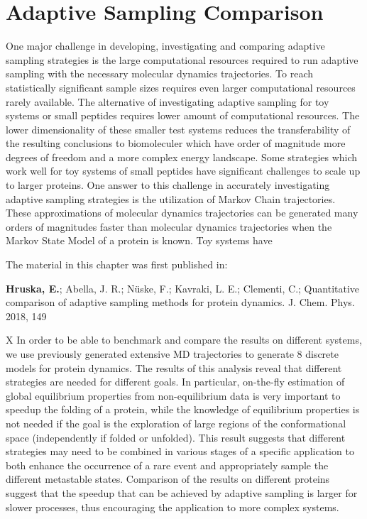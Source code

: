 

\afterpage{\null\newpage}
\chapter{Adaptive Sampling Comparison\label{ch:chapter32}}

One major challenge in developing, investigating and comparing adaptive sampling strategies is the large computational resources required to run adaptive sampling with the necessary molecular dynamics trajectories. To reach statistically significant sample sizes requires even larger computational resources rarely available.
The alternative of investigating adaptive sampling for toy systems or small peptides requires lower amount of computational resources. The lower dimensionality of these smaller test systems reduces the transferability of the resulting conclusions to biomoleculer which have order of magnitude more degrees of freedom and a more complex energy landscape. Some strategies which work well for toy systems of small peptides have significant challenges to scale up to larger proteins. One answer to this challenge in accurately investigating adaptive sampling strategies is the utilization of Markov Chain trajectories. These approximations of molecular dynamics trajectories can be generated many orders of magnitudes faster than molecular dynamics trajectories when the Markov State Model of a protein is known. Toy systems have 

The material in this chapter was first published in: 

\cite{Adstrategies2018} \textbf{Hruska, E.}; Abella, J. R.; N\"uske, F.;
Kavraki, L. E.; Clementi, C.; Quantitative
comparison of adaptive sampling methods
for protein dynamics. J. Chem. Phys.
2018, 149 


X
In order to be able to benchmark and compare the results on different systems, we
use previously generated extensive MD trajectories \cite{lindorff2011} to
generate 8 discrete models for protein dynamics.
The results of this analysis reveal that different strategies are needed
for different goals. In particular, on-the-fly estimation of global
equilibrium properties from non-equilibrium data is very important to speedup
the folding of a protein, while the knowledge of equilibrium properties is not
needed if the goal is the exploration of large regions of the conformational
space (independently if folded or unfolded). This result suggests that
different strategies may need to
be combined in various stages of a specific application to both enhance the
occurrence of a rare event and appropriately sample the different metastable states.
Comparison of the results on different proteins
suggest that the speedup that can be achieved by adaptive sampling is larger
for slower processes, thus encouraging the application to more complex systems.



